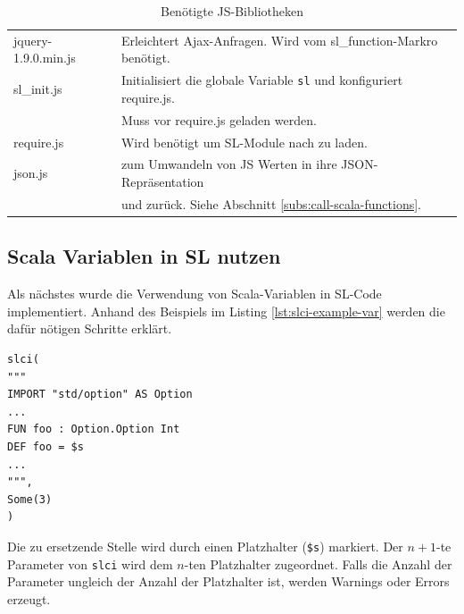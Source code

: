 \documentclass[12pt]{scrreprt}
\begin{document}
\begin{table}[h]
\caption{Benötigte \ac{JS}-Bibliotheken}
\centering
\begin{tabular}{ll}
jquery-1.9.0.min.js & Erleichtert Ajax-Anfragen. Wird vom sl\_function-Markro benötigt\cite{JQuery1}.\\
sl\_init.js         & Initialisiert die globale Variable \lstinline!sl! und konfiguriert require.js. \\
                    & Muss vor require.js geladen werden.\\
require.js          & Wird benötigt um \ac{SL}-Module nach zu laden\cite{RequireJS1}.\\
json.js             & zum Umwandeln von JS Werten in ihre JSON-Repräsentation \\
                    & und zurück. Siehe Abschnitt \ref{subs:call-scala-functions}\cite{Crockford2010}.\\
\end{tabular}
\label{tab:js-libraries}
\end{table}

\subsection{Scala Variablen in SL nutzen}

Als nächstes wurde die Verwendung von Scala-Variablen in \ac{SL}-Code implementiert. Anhand des Beispiels im Listing \ref{lst:slci-example-var} werden die dafür nötigen Schritte erklärt.

\begin{lstlisting}[caption={Beispielaufruf des slci Macros mit Scala Variablen}, label=lst:slci-example-var, float=h]
slci(
"""
IMPORT "std/option" AS Option 
...
FUN foo : Option.Option Int
DEF foo = $s
...
""",
Some(3)
)
\end{lstlisting}

Die zu ersetzende Stelle wird durch einen Platzhalter (\lstinline!$s!) markiert. Der $n+1$-te Parameter von \lstinline!slci! wird dem $n$-ten Platzhalter zugeordnet. Falls die Anzahl der Parameter ungleich der Anzahl der Platzhalter ist, werden Warnings oder Errors erzeugt. 
\end{document}
